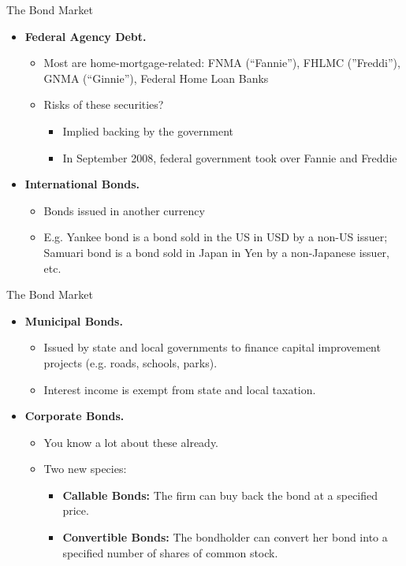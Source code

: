 \documentclass{beamer}
\begin{document}
\begin{frame}{The Bond Market}
\begin{itemize}
\item[3.]\textbf{Federal Agency Debt.} 
\begin{itemize}
\item Most are home-mortgage-related: FNMA (``Fannie''), FHLMC (''Freddi''), GNMA (``Ginnie''), Federal Home Loan Banks
\item Risks of these securities?
\begin{itemize}
\item Implied backing by the government
\item In September 2008, federal government took over Fannie and Freddie
\end{itemize}
\end{itemize}
\item[4.]\textbf{International Bonds.} 
\begin{itemize}
\item Bonds issued in another currency
\item E.g. Yankee bond is a bond sold in the US in USD by a non-US issuer; Samuari bond is a bond sold in Japan in Yen by a non-Japanese issuer, etc. 
\end{itemize}
\end{itemize}
\end{frame}

\begin{frame}{The Bond Market}
\begin{itemize}
\item[5.]\textbf{Municipal Bonds.} 
\begin{itemize}
\item Issued by state and local governments to finance capital improvement projects (e.g. roads, schools, parks). 
\item Interest income is exempt from state and local taxation.
\end{itemize}
\item[6.]\textbf{Corporate Bonds.} 
\begin{itemize}
\item You know a lot about these already. 
\item Two new species:
\begin{itemize}
\item\textbf{Callable Bonds:} The firm can buy back the bond at a specified price.
\item\textbf{Convertible Bonds:} The bondholder can convert her bond into a specified number of shares of common stock.
\end{itemize}
\end{itemize}
\end{itemize}
\end{frame}
\end{document}
